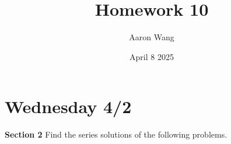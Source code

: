 \documentclass{article}
\title{Homework 10}
\author{Aaron Wang}
\date{April 8 2025}
\begin{document}
\maketitle
\section{Wednesday 4/2}
\begin{large}
 \textbf{Section 2} Find the series solutions of the following problems.
\end{large}
\begin{enumerate}
    \newpage
    \newpage
    
\end{enumerate}
\end{document}
